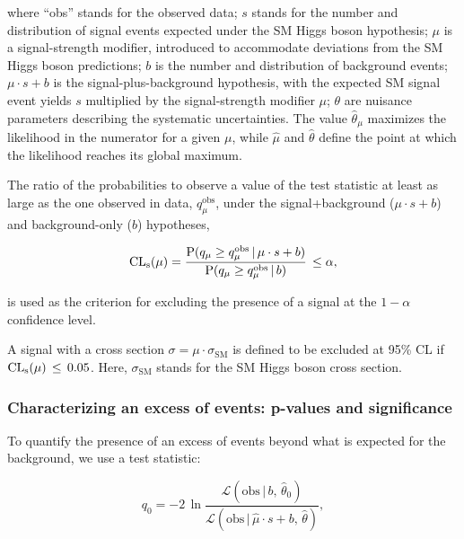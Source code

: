 \documentclass[11pt,twoside,a4paper,cmspaper,final,collab]{cms-tdr}
\begin{document}
where ``obs'' stands for the observed data;
$s$ stands for the number and distribution of signal events expected under the SM Higgs boson hypothesis;
$\mu$ is a signal-strength modifier,
introduced to accommodate deviations from the SM Higgs boson predictions;
$b$ is the number and distribution of background events;
$\mu \cdot s + b$ is the signal-plus-background hypothesis,
with the expected SM signal event yields $s$
multiplied by the signal-strength modifier $\mu$;
$\theta$ are nuisance parameters describing the systematic uncertainties.
The value $\hat \theta_{\mu}$ maximizes the likelihood in the numerator for a given $\mu$,
while $\hat \mu$ and $\hat \theta$ define the point at which the likelihood reaches its global maximum.


The ratio of the probabilities to observe a value of the test statistic
at least as large as the one observed in data, $q_{\mu}^{\mathrm{obs}}$,
under the signal+background ($\mu \cdot s + b$) and background-only ($b$) hypotheses,


\begin{equation}
\mathrm{CL_s} (\mu) = \frac {\mathrm{P}(q_{\mu} \geq q_{\mu}^{\mathrm{obs}} \, | \, \mu \cdot s+b)}
             {\mathrm{P}(q_{\mu} \geq q_{\mu}^{\mathrm{obs}} \, | \, b )} \, \leq \alpha ,
\end{equation}

is used as the criterion for excluding the presence of a signal at the $1 - \alpha$ confidence level.

A signal with a cross section $\sigma = \mu \cdot
\sigma_{\mathrm{SM}}$ is defined to be excluded at 95\% CL
if $\mathrm{CL_s} (\mu)\, \leq \, 0.05$. Here, $\sigma_{\mathrm{SM}}$ stands for the SM Higgs boson cross section.



\subsubsection{Characterizing an excess of events: p-values and significance}


To quantify the presence of an excess of events beyond what is expected for the background,
we use a test statistic:


\begin{equation}
\label{eq:method_q0}
 q_{0} = - 2 \, \ln \frac {\mathcal{L}(\mathrm{obs} \, | \, b, \, \hat \theta_{0} ) }
                       {\mathcal{L}(\mathrm{obs} \, | \, \hat \mu \cdot s + b, \, \hat \theta ) } ,
\end{equation}
\end{document}
